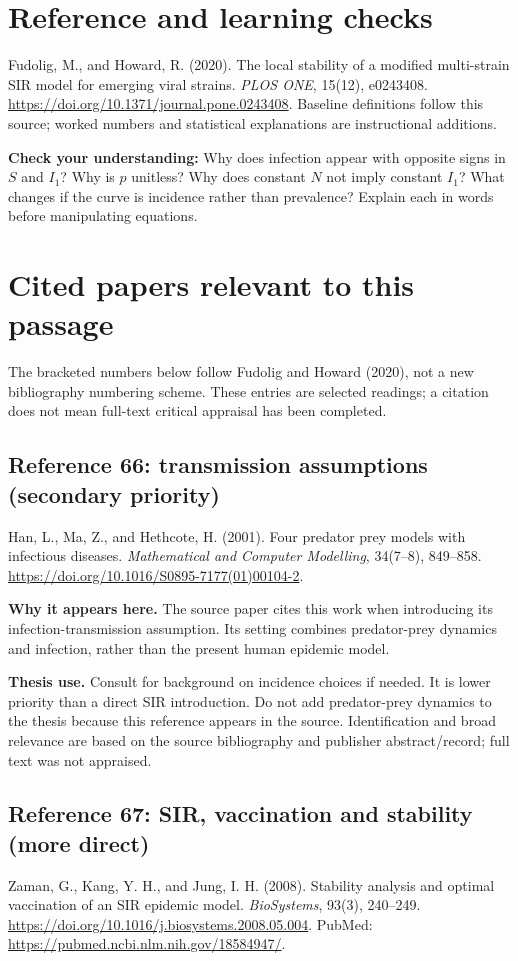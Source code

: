 \documentclass[11pt]{article}
\begin{document}
\section{Reference and learning checks}
Fudolig, M., and Howard, R. (2020). The local stability of a modified multi-strain SIR model for emerging viral strains. \emph{PLOS ONE}, 15(12), e0243408. \url{https://doi.org/10.1371/journal.pone.0243408}. Baseline definitions follow this source; worked numbers and statistical explanations are instructional additions.

\textbf{Check your understanding:} Why does infection appear with opposite signs in $S$ and $I_1$? Why is $p$ unitless? Why does constant $N$ not imply constant $I_1$? What changes if the curve is incidence rather than prevalence? Explain each in words before manipulating equations.
\newpage
\section{Cited papers relevant to this passage}
The bracketed numbers below follow Fudolig and Howard (2020), not a new bibliography numbering scheme. These entries are selected readings; a citation does not mean full-text critical appraisal has been completed.

\subsection*{Reference 66: transmission assumptions (secondary priority)}
Han, L., Ma, Z., and Hethcote, H. (2001). Four predator prey models with infectious diseases. \emph{Mathematical and Computer Modelling}, 34(7--8), 849--858.
\url{https://doi.org/10.1016/S0895-7177(01)00104-2}.

\textbf{Why it appears here.} The source paper cites this work when introducing its infection-transmission assumption. Its setting combines predator-prey dynamics and infection, rather than the present human epidemic model.

\textbf{Thesis use.} Consult for background on incidence choices if needed. It is lower priority than a direct SIR introduction. Do not add predator-prey dynamics to the thesis because this reference appears in the source. Identification and broad relevance are based on the source bibliography and publisher abstract/record; full text was not appraised.

\subsection*{Reference 67: SIR, vaccination and stability (more direct)}
Zaman, G., Kang, Y. H., and Jung, I. H. (2008). Stability analysis and optimal vaccination of an SIR epidemic model. \emph{BioSystems}, 93(3), 240--249.
\url{https://doi.org/10.1016/j.biosystems.2008.05.004}.
PubMed: \url{https://pubmed.ncbi.nlm.nih.gov/18584947/}.
\end{document}
